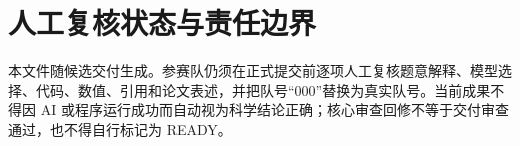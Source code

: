\documentclass[UTF8,11pt,a4paper]{ctexart}
\begin{document}
\section{人工复核状态与责任边界}
本文件随候选交付生成。参赛队仍须在正式提交前逐项人工复核题意解释、模型选择、代码、数值、引用和论文表述，并把队号“000”替换为真实队号。当前成果不得因 AI 或程序运行成功而自动视为科学结论正确；核心审查回修不等于交付审查通过，也不得自行标记为 READY。
\end{document}
